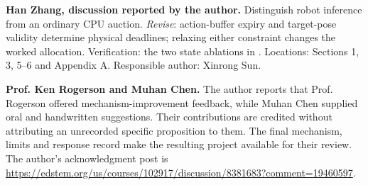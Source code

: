 \textbf{Han Zhang, discussion reported by the author.} Distinguish robot inference from an ordinary CPU auction. \emph{Revise}: action-buffer expiry and target-pose validity determine physical deadlines; relaxing either constraint changes the worked allocation. Verification: the two state ablations in . Locations: Sections 1, 3, 5--6 and Appendix A. Responsible author: Xinrong Sun.

\textbf{Prof. Ken Rogerson and Muhan Chen.} The author reports that Prof. Rogerson offered mechanism-improvement feedback, while Muhan Chen supplied oral and handwritten suggestions. Their contributions are credited without attributing an unrecorded specific proposition to them. The final mechanism, limits and response record make the resulting project available for their review. The author's acknowledgment post is \url{https://edstem.org/us/courses/102917/discussion/8381683?comment=19460597}.

